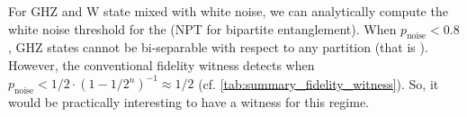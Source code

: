 \documentclass[
reprint,
aps,
pra,
floatfix,
]{revtex4-2}
\theoremstyle{plain}
\newtheorem{proposition}{Proposition}
\theoremstyle{definition}
\newcommand{\ew}{W}
\newcommand{\dm}{\rho}
\newcommand{\noise}{\text{noise}}
\begin{document}

For GHZ and W state mixed with white noise, we can analytically compute the white noise threshold for the  (NPT for bipartite entanglement).
When $p_{\noise}<0.8$, GHZ states cannot be bi-separable with respect to any partition (that is ).
However, the conventional fidelity witness detects  when $p_{\noise}<1/2 \cdot (1-1/2^n)^{-1}\approx 1/2$ (cf. \cref{tab:summary_fidelity_witness}).
So, it would be practically interesting to have a witness for this regime.
\end{document}
